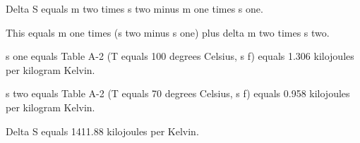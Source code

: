 Delta S equals m two times s two minus m one times s one.  

This equals m one times (s two minus s one) plus delta m two times s two.  

s one equals Table A-2 (T equals 100 degrees Celsius, s f) equals 1.306 kilojoules per kilogram Kelvin.  

s two equals Table A-2 (T equals 70 degrees Celsius, s f) equals 0.958 kilojoules per kilogram Kelvin.  

Delta S equals 1411.88 kilojoules per Kelvin.